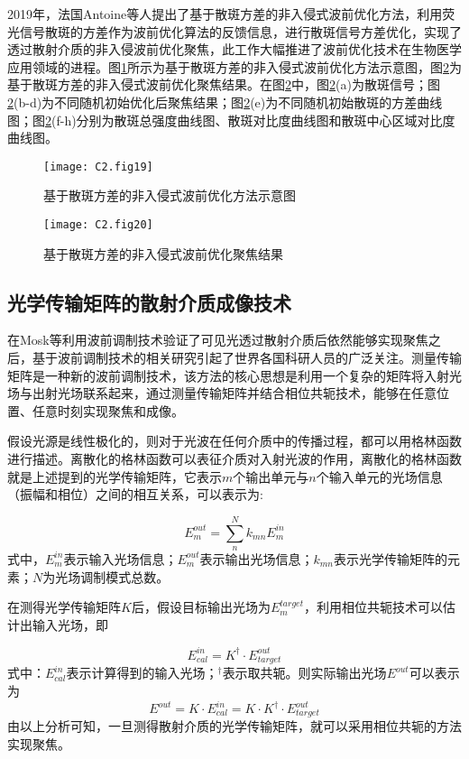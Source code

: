 2019年，法国Antoine等人提出了基于散斑方差的非入侵式波前优化方法，利用荧光信号散斑的方差作为波前优化算法的反馈信息，进行散斑信号方差优化，实现了透过散射介质的非入侵波前优化聚焦，此工作大幅推进了波前优化技术在生物医学应用领域的进程。图\ref{fig2:19}所示为基于散斑方差的非入侵式波前优化方法示意图，图\ref{fig2:20}为基于散斑方差的非入侵式波前优化聚焦结果。在图\ref{fig2:20}中，图\ref{fig2:20}(a)为散斑信号；图\ref{fig2:20}(b-d)为不同随机初始优化后聚焦结果；图\ref{fig2:20}(e)为不同随机初始散斑的方差曲线图；图\ref{fig2:20}(f-h)分别为散斑总强度曲线图、散斑对比度曲线图和散斑中心区域对比度曲线图。

\begin{figure}[htp]
	\centering
	\texttt{[image: C2.fig19]}
	\caption{基于散斑方差的非入侵式波前优化方法示意图}
	\label{fig2:19}
\end{figure}

\begin{figure}[htp]
	\centering
	\texttt{[image: C2.fig20]}
	\caption{基于散斑方差的非入侵式波前优化聚焦结果}
	\label{fig2:20}
\end{figure}

\subsection{光学传输矩阵的散射介质成像技术}

在Mosk等利用波前调制技术验证了可见光透过散射介质后依然能够实现聚焦之后，基于波前调制技术的相关研究引起了世界各国科研人员的广泛关注。测量传输矩阵是一种新的波前调制技术，该方法的核心思想是利用一个复杂的矩阵将入射光场与出射光场联系起来，通过测量传输矩阵并结合相位共轭技术，能够在任意位置、任意时刻实现聚焦和成像。

假设光源是线性极化的，则对于光波在任何介质中的传播过程，都可以用格林函数进行描述。离散化的格林函数可以表征介质对入射光波的作用，离散化的格林函数就是上述提到的光学传输矩阵，它表示$m$个输出单元与$n$个输入单元的光场信息（振幅和相位）之间的相互关系，可以表示为:

\begin{equation}
    E_{m}^{out}=\sum_{n}^{N}k_{mn}E_{m}^{in}
\label{eq:2.1}
\end{equation}
式中，$E_{m}^{in}$表示输入光场信息；$E_{m}^{out}$表示输出光场信息；$k_{mn}$表示光学传输矩阵的元素；$N$为光场调制模式总数。

在测得光学传输矩阵$K$后，假设目标输出光场为$E_{m}^{target}$，利用相位共轭技术可以估计出输入光场，即

\begin{equation}
    E_{cal}^{in}=K^{\dag} \cdot E_{target}^{out}
\label{eq:2.2}
\end{equation}
式中：$E_{cal}^{in}$表示计算得到的输入光场；$^{\dag}$表示取共轭。则实际输出光场$E^{out}$可以表示为
\begin{equation}
  E^{out}=K \cdot E_{cal}^{in} =K \cdot K^{\dag} \cdot E_{target}^{out}
\label{eq:2.3}
\end{equation}
由以上分析可知，一旦测得散射介质的光学传输矩阵，就可以采用相位共轭的方法实现聚焦。

